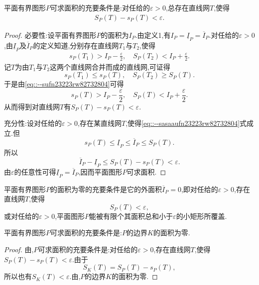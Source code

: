 \documentclass[../../main.tex]{subfiles}%
\begin{document}
\begin{theorem}\label{theorem:平面有界图形可求面积的充要条件1}
平面有界图形$P$可求面积的充要条件是:对任给的$\varepsilon > 0$,总存在直线网$T$,使得
\begin{align}
S_P(T) - s_P(T) < \varepsilon. \label{eq::--sasaaufn23223rw82732804}
\end{align}
\end{theorem}
\begin{proof}

{\heiti 必要性:}设平面有界图形$P$的面积为$I_P$.由定义1,有$I_P = \underline{I}_P = \overline{I}_P$.对任给的$\varepsilon > 0$,由$\underline{I}_P$及$\overline{I}_P$的定义知道,分别存在直线网$T_1$与$T_2$,使得
\begin{align}
s_P(T_1) > I_P - \frac{\varepsilon}{2}, \quad S_P(T_2) < I_P + \frac{\varepsilon}{2}. \label{eq::--sufn23223rw82732804}
\end{align}
记$T$为由$T_1$与$T_2$这两个直线网合并而成的直线网,可证得
\[
s_P(T_1) \leqslant s_P(T), \quad S_P(T_2) \geqslant S_P(T).
\]
于是由\eqref{eq::--sufn23223rw82732804}可得
\[
s_P(T) > I_P - \frac{\varepsilon}{2}, \quad S_P(T) < I_P + \frac{\varepsilon}{2}.
\]
从而得到对直线网$T$有$S_P(T) - s_P(T) < \varepsilon$.

{\heiti 充分性:}设对任给的$\varepsilon > 0$,存在某直线网$T$,使得\eqref{eq::--sasaaufn23223rw82732804}式成立.但
\[
s_P(T) \leqslant \underline{I}_P \leqslant \overline{I}_P \leqslant S_P(T).
\]
所以
\[
\overline{I}_P - \underline{I}_P \leqslant S_P(T) - s_P(T) < \varepsilon.
\]
由$\varepsilon$的任意性可得$\underline{I}_P = \overline{I}_P$,因而平面图形$P$可求面积.
\end{proof}

\begin{corollary}\label{corollary:平面有界图形可求面积的充要条件2}
平面有界图形$P$的面积为零的充要条件是它的外面积$\overline{I}_P = 0$,即对任给的$\varepsilon > 0$,存在直线网$T$,使得
\[
S_P(T) < \varepsilon,
\]
或对任给的$\varepsilon > 0$,平面图形$P$能被有限个其面积总和小于$\varepsilon$的小矩形所覆盖.
\end{corollary}

\begin{theorem}
平面有界图形$P$可求面积的充要条件是:$P$的边界$K$的面积为零.
\end{theorem}
\begin{proof}
由,$P$可求面积的充要条件是:对任给的$\varepsilon > 0$,存在直线网$T$,使得$S_P(T) - s_P(T) < \varepsilon$.由于
\[
S_K(T) = S_P(T) - s_P(T),
\]
所以也有$S_K(T) < \varepsilon$.由,$P$的边界$K$的面积为零.
\end{proof}
\end{document}
